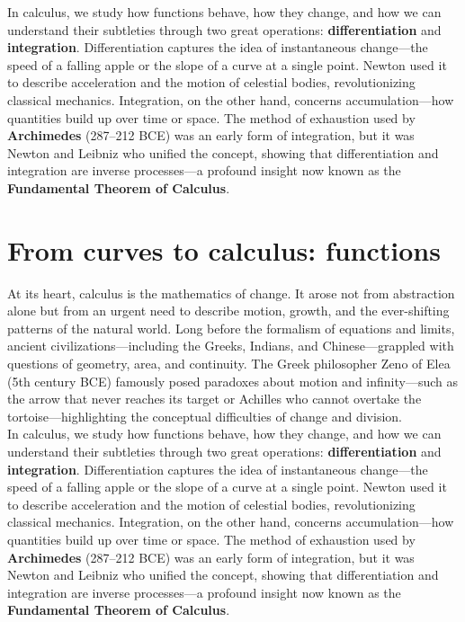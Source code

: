 \documentclass{book}
\begin{document}
In calculus, we study how functions behave, how they change, and how we can understand their subtleties through two great operations: \textbf{differentiation} and \textbf{integration}. Differentiation captures the idea of instantaneous change---the speed of a falling apple or the slope of a curve at a single point. Newton used it to describe acceleration and the motion of celestial bodies, revolutionizing classical mechanics. Integration, on the other hand, concerns accumulation---how quantities build up over time or space. The method of exhaustion used by \textbf{Archimedes} (287--212 BCE) was an early form of integration, but it was Newton and Leibniz who unified the concept, showing that differentiation and integration are inverse processes---a profound insight now known as the \textbf{Fundamental Theorem of Calculus}.\\

\section{From curves to calculus: functions}

At its heart, calculus is the mathematics of change. It arose not from abstraction alone but from an urgent need to describe motion, growth, and the ever-shifting patterns of the natural world. Long before the formalism of equations and limits, ancient civilizations---including the Greeks, Indians, and Chinese---grappled with questions of geometry, area, and continuity. The Greek philosopher Zeno of Elea (5th century BCE) famously posed paradoxes about motion and infinity---such as the arrow that never reaches its target or Achilles who cannot overtake the tortoise---highlighting the conceptual difficulties of change and division.\\

In calculus, we study how functions behave, how they change, and how we can understand their subtleties through two great operations: \textbf{differentiation} and \textbf{integration}. Differentiation captures the idea of instantaneous change---the speed of a falling apple or the slope of a curve at a single point. Newton used it to describe acceleration and the motion of celestial bodies, revolutionizing classical mechanics. Integration, on the other hand, concerns accumulation---how quantities build up over time or space. The method of exhaustion used by \textbf{Archimedes} (287--212 BCE) was an early form of integration, but it was Newton and Leibniz who unified the concept, showing that differentiation and integration are inverse processes---a profound insight now known as the \textbf{Fundamental Theorem of Calculus}.\\
\end{document}
